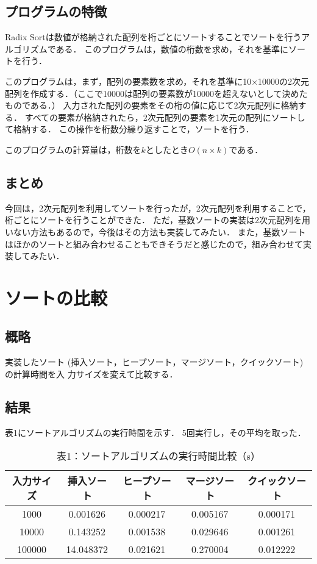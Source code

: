 \documentclass{ltjsarticle}
\begin{document}
\subsection{プログラムの特徴}
Radix Sortは数値が格納された配列を桁ごとにソートすることでソートを行うアルゴリズムである．
このプログラムは，数値の桁数を求め，それを基準にソートを行う．

このプログラムは，まず，配列の要素数を求め，それを基準に10$\times $10000の2次元配列を作成する．（ここで10000は配列の要素数が10000を超えないとして決めたものである．）
入力された配列の要素をその桁の値に応じて2次元配列に格納する．
すべての要素が格納されたら，2次元配列の要素を1次元の配列にソートして格納する．
この操作を桁数分繰り返すことで，ソートを行う．

このプログラムの計算量は，桁数を$k$としたとき$O(n\times k)$である．

\subsection{まとめ}
今回は，2次元配列を利用してソートを行ったが，2次元配列を利用することで，桁ごとにソートを行うことができた．
ただ，基数ソートの実装は2次元配列を用いない方法もあるので，今後はその方法も実装してみたい．
また，基数ソートはほかのソートと組み合わせることもできそうだと感じたので，組み合わせて実装してみたい．


\section{ソートの比較}
\subsection{概略}
実装したソート (挿入ソート，ヒープソート，マージソート，クイックソート) の計算時間を入
力サイズを変えて比較する．

\subsection{結果}
表1にソートアルゴリズムの実行時間を示す．
5回実行し，その平均を取った．
\begin{table}[htbp]
    \centering
    \caption{表1：ソートアルゴリズムの実行時間比較（s）}
    \begin{tabular}{|c|c|c|c|c|}
        \hline
        \textbf{入力サイズ} & \textbf{挿入ソート} & \textbf{ヒープソート} & \textbf{マージソート} & \textbf{クイックソート} \\
        \hline
        1000 & 0.001626 & 0.000217 & 0.005167 & 0.000171 \\
        10000 & 0.143252 & 0.001538 & 0.029646 & 0.001261 \\
        100000 & 14.048372 & 0.021621 & 0.270004 & 0.012222 \\
        \hline
    \end{tabular}
\end{table}
\end{document}
